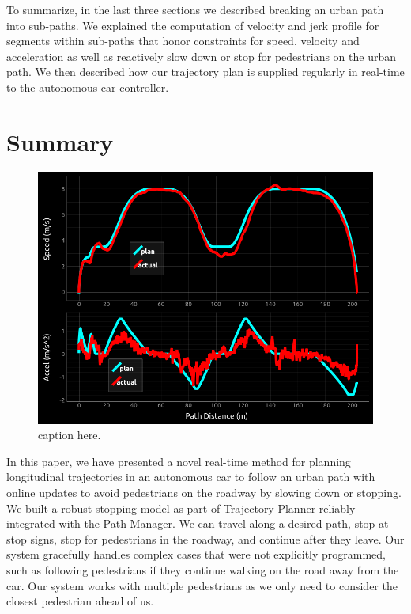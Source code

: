 \documentclass[letterpaper, 10 pt, conference]{ieeeconf}  %
\begin{document}

To summarize, in the last three sections we described breaking an urban path into sub-paths. We 
explained the computation of velocity and jerk profile for segments within sub-paths that honor constraints
for speed, velocity and acceleration as well as reactively slow down or stop for pedestrians on
the urban path. We then described how our trajectory plan is supplied regularly in real-time to the
autonomous car controller.

\section{Summary} \label{sec:summary}


\begin{figure}[thpb]
  \centering
  \includegraphics[width=0.9\columnwidth]{graphics/results_final.png}
  \caption{caption here.}

  \label{fig:results_sort_of}
\end{figure}


In this paper, we have presented a novel real-time method for planning longitudinal trajectories in an autonomous car to follow an urban path with online updates to avoid pedestrians on the roadway by slowing down or stopping.
We built a robust stopping model as part of Trajectory Planner reliably integrated with the Path Manager.
We can travel along a desired path, stop at stop signs, stop for pedestrians in the roadway, and continue after they leave.
Our system gracefully handles complex cases that were not explicitly programmed, such as following pedestrians if they continue walking on the road away from the car. 
Our system works with multiple pedestrians as we only need to consider the closest pedestrian ahead of us. 
\end{document}
